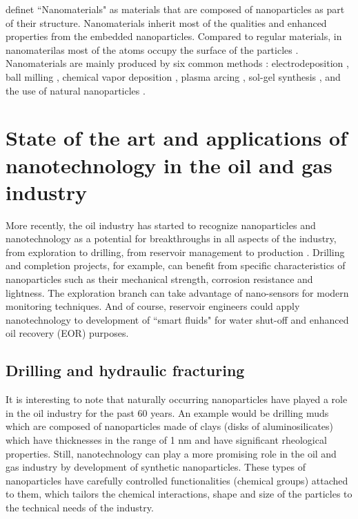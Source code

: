 \citet{Fakoya2017} definet ``Nanomaterials"  as materials that are composed of nanoparticles as part of their structure. Nanomaterials inherit most of the qualities and enhanced properties from the embedded nanoparticles. Compared to regular materials, in nanomaterilas most of the atoms occupy the surface of the particles \citep{Wilson2002}. Nanomaterials are mainly produced by six common methods \citep{Hussainova2010}: electrodeposition \citep{Bera2004}, ball milling \citep{Cao2007}, chemical vapor deposition \citep{AZO2013}, plasma arcing \citep{Shashurin2015}, sol-gel synthesis \citep{Ficai2017}, and the use of natural nanoparticles \citep{Wilson2002}. 

\section{State of the art and applications of nanotechnology in the oil and gas industry}
More recently, the oil industry has started to recognize nanoparticles and nanotechnology as a potential for breakthroughs in all aspects of the industry, from exploration to drilling, from reservoir management to production \citep{Cocuzza2011}. Drilling and completion projects, for example, can benefit from specific characteristics of nanoparticles such as their mechanical strength, corrosion resistance and lightness. The exploration branch can take advantage of nano-sensors for modern monitoring techniques. And of course, reservoir engineers could apply nanotechnology to development of ``smart fluids" for water shut-off and enhanced oil recovery (EOR)  purposes. 

\subsection{Drilling and hydraulic fracturing}
It is interesting to note that naturally occurring nanoparticles have played a role in the oil industry for the past 60 years. An example would be drilling muds  which are composed of nanoparticles made of clays (disks of aluminosilicates) which have thicknesses in the range of 1 nm \citep{Krishnamoorti2015} and have significant rheological properties. Still, nanotechnology can play a more promising role in the oil and gas industry by development of synthetic nanoparticles. These types of nanoparticles have carefully controlled functionalities (chemical groups) attached to them, which tailors the chemical interactions, shape and size of the particles to the technical needs of the industry.

